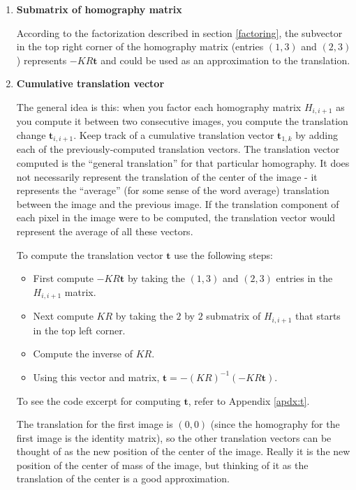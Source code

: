 \documentclass{article}
\begin{document}
\begin{enumerate}

\item \textbf{Submatrix of homography matrix}

According to the factorization described in section \ref{factoring}, the
subvector in the top right corner of the homography matrix (entries $(1, 3)$
and $(2, 3)$) represents $-KR\mathbf{t}$ and could be used as an approximation
to the translation. 

\item \textbf{Cumulative translation vector} 

The general idea is this: when you factor each homography matrix $H_{i, i + 1}$
as you compute it between two consecutive images, you compute the translation
change $\mathbf{t}_{i, i + 1}$. Keep track of a cumulative translation vector
$\mathbf{t}_{1, k}$ by adding each of the previously-computed translation
vectors. The translation vector computed is the ``general translation'' for
that particular homography. It does not necessarily represent the translation
of the center of the image - it represents the ``average'' (for some sense of
the word average) translation between the image and the previous image. If the
translation component of each pixel in the image were to be computed, the
translation vector would represent the average of all these vectors.

To compute the translation vector $\mathbf{t}$ use the following steps:

\begin{itemize}

\item First compute $-KR\mathbf{t}$ by taking the $(1, 3)$ and $(2, 3)$ entries
in the $H_{i, i + 1}$ matrix.

\item Next compute $KR$ by taking the $2$ by $2$ submatrix of $H_{i, i + 1}$
that starts in the top left corner.

\item Compute the inverse of $KR$.

\item Using this vector and matrix, $\mathbf{t} = -(KR)^{-1}(-KR\mathbf{t})$.  

\end{itemize}

To see the code excerpt for computing $\mathbf{t}$, refer to Appendix \ref{apdx:t}.

The translation for the first image is $(0, 0)$ (since the homography for the
first image is the identity matrix), so the other translation vectors can be
thought of as the new position of the center of the image. Really it is the new
position of the center of mass of the image, but thinking of it as the
translation of the center is a good approximation. 


\end{enumerate}
\end{document}
